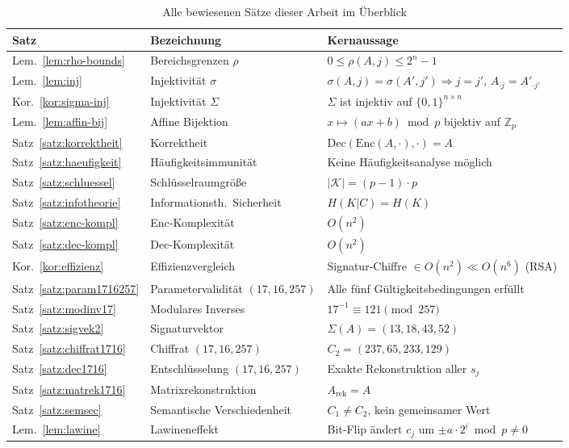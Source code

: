 ﻿\documentclass[a4paper,12pt]{scrreprt}
\theoremstyle{definition}
\begin{document}
\begin{table}[H]
\centering
\caption{Alle bewiesenen Sätze dieser Arbeit im Überblick}
\label{tab:saetze}
\begin{tabular}{@{}p{1.2cm}p{4.5cm}p{7cm}@{}}
\toprule
\textbf{Satz} & \textbf{Bezeichnung} & \textbf{Kernaussage} \\
\midrule
Lem.~\ref{lem:rho-bounds} & Bereichsgrenzen $\rho$ & $0 \leq \rho(A,j) \leq 2^n-1$ \\
Lem.~\ref{lem:inj} & Injektivität $\sigma$ & $\sigma(A,j)=\sigma(A',j') \Rightarrow j=j',\,A_{\cdot j}=A'_{\cdot j'}$ \\
Kor.~\ref{kor:sigma-inj} & Injektivität $\Sigma$ & $\Sigma$ ist injektiv auf $\{0,1\}^{n\times n}$ \\
Lem.~\ref{lem:affin-bij} & Affine Bijektion & $x \mapsto (ax+b)\bmod p$ bijektiv auf $\mathbb{Z}_p$ \\
Satz~\ref{satz:korrektheit} & Korrektheit & $\mathrm{Dec}(\mathrm{Enc}(A,\cdot),\cdot)=A$ \\
Satz~\ref{satz:haeufigkeit} & Häufigkeitsimmunität & Keine Häufigkeitsanalyse möglich \\
Satz~\ref{satz:schluessel} & Schlüsselraumgröße & $|\mathcal{K}|=(p-1)\cdot p$ \\
Satz~\ref{satz:infotheorie} & Informationsth.\ Sicherheit & $H(K|C)=H(K)$ \\
Satz~\ref{satz:enc-kompl} & Enc-Komplexität & $O(n^2)$ \\
Satz~\ref{satz:dec-kompl} & Dec-Komplexität & $O(n^2)$ \\
Kor.~\ref{kor:effizienz} & Effizienzvergleich & Signatur-Chiffre $\in O(n^2) \ll O(n^6)$ (RSA) \\
Satz~\ref{satz:param1716257} & Parametervalidität $(17,16,257)$ & Alle fünf Gültigkeitsbedingungen erfüllt \\
Satz~\ref{satz:modinv17} & Modulares Inverses & $17^{-1}\equiv 121\pmod{257}$ \\
Satz~\ref{satz:sigvek2} & Signaturvektor & $\Sigma(A)=(13,18,43,52)$ \\
Satz~\ref{satz:chiffrat1716} & Chiffrat $(17,16,257)$ & $C_2=(237,65,233,129)$ \\
Satz~\ref{satz:dec1716} & Entschlüsselung $(17,16,257)$ & Exakte Rekonstruktion aller $s_j$ \\
Satz~\ref{satz:matrek1716} & Matrixrekonstruktion & $A_{\mathrm{rek}} = A$ \\
Satz~\ref{satz:semsec} & Semantische Verschiedenheit & $C_1 \neq C_2$, kein gemeinsamer Wert \\
Lem.~\ref{lem:lawine} & Lawineneffekt & Bit-Flip ändert $c_j$ um $\pm a\cdot 2^i \bmod p \neq 0$ \\
\bottomrule
\end{tabular}
\end{table}
\end{document}
